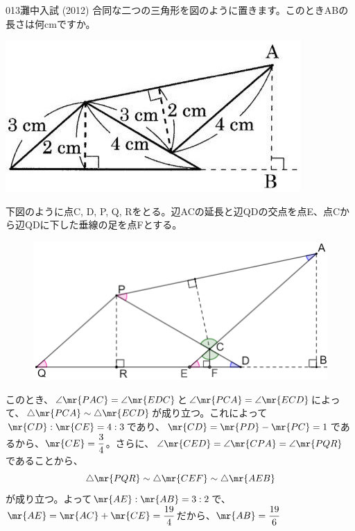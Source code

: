\begin{thm}{013}{}{灘中入試 (2012)}
 合同な二つの三角形を図のように置きます。このときABの長さは何cmですか。
 \begin{center}
  \includegraphics[width=0.6\linewidth]{../problems/Q_013/Q_013.jpg}
 \end{center}
\end{thm}

下図のように点C, D, P, Q, Rをとる。辺ACの延長と辺QDの交点を点E、点Cから辺QDに下した垂線の足を点Fとする。
\begin{figure}[H]
 \centering
 \includegraphics[width=0.6\linewidth]{../problems/Q_013/A_013.png}
\end{figure}
このとき、$\angle\mr{PAC}=\angle\mr{EDC}$と$\angle\mr{PCA}=\angle\mr{ECD}$によって、$\triangle\mr{PCA}\sim\triangle\mr{ECD}$が成り立つ。これによって$\mr{CD}:\mr{CE}=4:3$であり、$\mr{CD}=\mr{PD}-\mr{PC}=1$であるから、$\mr{CE}=\dfrac{3}{4}$。さらに、$\angle\mr{CED}=\angle\mr{CPA}=\angle\mr{PQR}$であることから、
\[ \triangle\mr{PQR}\sim\triangle\mr{CEF}\sim\triangle\mr{AEB} \]
が成り立つ。よって$\mr{AE}:\mr{AB}=3:2$で、$\mr{AE}=\mr{AC}+\mr{CE}=\dfrac{19}{4}$だから、$\mr{AB}=\dfrac{19}{6}$